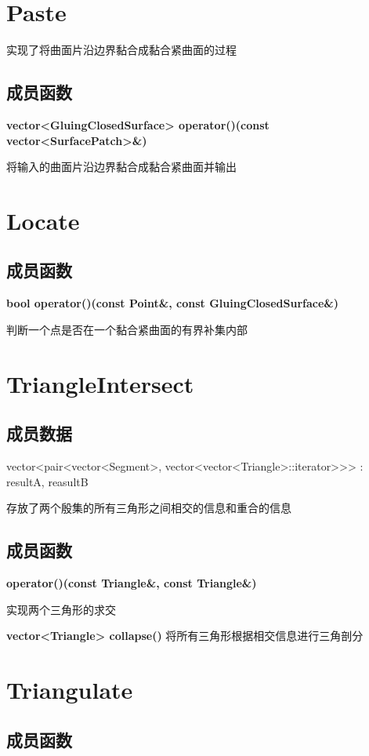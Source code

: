 \documentclass[a4paper]{book}
\numberwithin{equation}{chapter}
\theoremstyle{definition}
\begin{document}
\section{Paste}
实现了将曲面片沿边界黏合成黏合紧曲面的过程



\subsection{成员函数}
\textbf{vector<GluingClosedSurface> operator()(const vector<SurfacePatch>\&)}

将输入的曲面片沿边界黏合成黏合紧曲面并输出

\section{Locate}

\subsection{成员函数}
\textbf{bool operator()(const Point\&, const GluingClosedSurface\&)}

判断一个点是否在一个黏合紧曲面的有界补集内部

\section{TriangleIntersect}

\subsection{成员数据}
vector<pair<vector<Segment>,
vector<vector<Triangle>::iterator>>> :
resultA, reasultB

存放了两个殷集的所有三角形之间相交的信息和重合的信息

\subsection{成员函数}
\textbf{operator()(const Triangle\&, const
Triangle\&)}

实现两个三角形的求交

\textbf{vector<Triangle> collapse()}
将所有三角形根据相交信息进行三角剖分

\section{Triangulate}

\subsection{成员函数}
\end{document}
